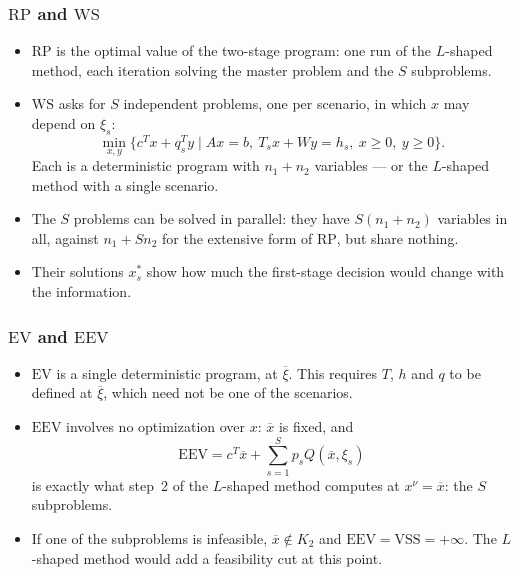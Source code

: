 \documentclass[aspectratio=169]{beamer}
\newcommand{\WS}{\mathrm{WS}}
\newcommand{\RP}{\mathrm{RP}}
\newcommand{\EV}{\mathrm{EV}}
\newcommand{\EEV}{\mathrm{EEV}}
\newcommand{\VSS}{\mathrm{VSS}}
\begin{document}
\begin{frame}
\frametitle{$\RP$ and $\WS$}

\begin{itemize}
\item
{\blue $\RP$} is the optimal value of the two-stage program: one run of the $L$-shaped method, each
iteration solving the master problem and the $S$ subproblems.
\item
{\blue $\WS$} asks for $S$ {\red independent} problems, one per scenario, in which $x$ may depend on
$\xi_s$:
\[
\min_{x, y} \lbrace c^Tx + q_s^Ty \mid Ax = b,\ T_sx + Wy = h_s,\ x \geq 0,\ y \geq 0 \rbrace.
\]
Each is a deterministic program with $n_1 + n_2$ variables --- or the $L$-shaped method with a
single scenario.
\item
The $S$ problems can be solved in parallel: they have $S(n_1 + n_2)$ variables in all, against
$n_1 + Sn_2$ for the extensive form of $\RP$, but share nothing.
\item
Their solutions $x_s^*$ show how much the first-stage decision would change with the information.
\end{itemize}

\end{frame}

\begin{frame}
\frametitle{$\EV$ and $\EEV$}

\begin{itemize}
\item
{\blue $\EV$} is a single deterministic program, at $\overline{\xi}$. This requires $T$, $h$ and $q$
to be defined at $\overline{\xi}$, which need not be one of the scenarios.
\item
{\blue $\EEV$} involves no optimization over $x$: $\overline{x}$ is fixed, and
\[
\EEV = c^T\overline{x} + \sum_{s=1}^S p_s Q(\overline{x}, \xi_s)
\]
is exactly what step~2 of the $L$-shaped method computes at $x^{\nu} = \overline{x}$: the $S$
subproblems.
\item
If one of the subproblems is infeasible, $\overline{x} \notin K_2$ and $\EEV = \VSS = +\infty$. The
$L$-shaped method would add a feasibility cut at this point.
\end{itemize}

\end{frame}
\end{document}
